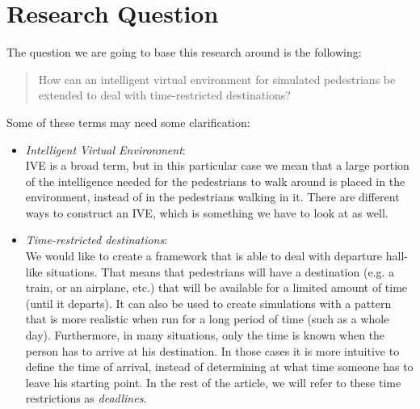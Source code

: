 \documentclass[11pt]{book}
\begin{document}
\section{Research Question}
The question we are going to base this research around is the following:
\begin{quote}
How can an intelligent virtual environment for simulated pedestrians be extended to deal with time-restricted destinations?
\end{quote}
Some of these terms may need some clarification:
\begin{itemize}
\item \emph{Intelligent Virtual Environment}:\\
IVE is a broad term, but in this particular case we mean that a large portion of the intelligence needed for the pedestrians to walk around is placed in the environment, instead of in the pedestrians walking in it. There are different ways to construct an IVE, which is something we have to look at as well.

\item \emph{Time-restricted destinations}:\\
We would like to create a framework that is able to deal with departure hall-like situations. That means that pedestrians will have a destination (e.g. a train, or an airplane, etc.) that will be available for a limited amount of time (until it departs). It can also be used to create simulations with a pattern that is more realistic when run for a long period of time (such as a whole day). Furthermore, in many situations, only the time is known when the person has to arrive at his destination. In those cases it is more intuitive to define the time of arrival, instead of determining at what time someone has to leave his starting point. In the rest of the article, we will refer to these time restrictions as \emph{deadlines}.
\end{itemize}
\end{document}
